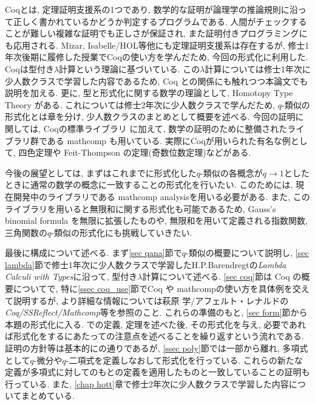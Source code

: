 \documentclass[11pt]{jsreport}
\theoremstyle{mystyle}
\newcommand{\0}{\textbf{0}}
\newcommand{\1}{\textbf{1}}
\newcommand{\2}{\textbf{2}}
\begin{document}
Coqとは, 定理証明支援系の1つであり, 数学的な証明が論理学の推論規則に沿って正しく書かれているかどうか判定するプログラムである.
人間がチェックすることが難しい複雑な証明でも正しさが保証され, また証明付きプログラミングにも応用される. Mizar, Isabelle/HOL等他にも定理証明支援系は存在するが, 修士1年次後期に履修した授業でCoqの使い方を学んだため, 今回の形式化に利用した. 
Coqは型付き$\lambda$計算という理論に基づいている. この$\lambda$計算については修士1年次に少人数クラスで学習した内容であるため, Coq との関係にも触れつつ本論文でも説明を加える. 更に, 型と形式化に関する数学の理論として, Homotopy Type Theory がある. これについては修士2年次に少人数クラスで学んだため, $q$-類似の形式化とは章を分け, 少人数クラスのまとめとして概要を述べる. 今回の証明に関しては, Coqの標準ライブラリ \cite{coq sl}に加えて, 数学の証明のために整備されたライブラリ群である mathcomp \cite{coq mc}も用いている. 
実際にCoqが用いられた有名な例として, 四色定理や Feit-Thompson の定理(奇数位数定理)などがある. 

今後の展望としては, まずはこれまでに形式化した$q$-類似の各概念が$q \to 1$としたときに通常の数学の概念に一致することの形式化を行いたい. このためには, 現在開発中のライブラリである mathcomp analysis\cite{coq ana}を用いる必要がある. また, このライブラリを用いると無限和に関する形式化も可能であるため, Gauss's binomial formula を無限に拡張したものや, 無限和を用いて定義される指数関数, 三角関数の$q$-類似の形式化にも挑戦していきたい. 

最後に構成について述べる. 
まず\ref{sec qana}節で$q$-類似の概要について説明し, 
\ref{sec lambda}節で修士1年次に少人数クラスで学習したH.P.Barendregtの{\it Lambda Calculi with Types}\cite{Bar}に沿って, 型付き$\lambda$計算について述べる. 
\ref{sec coq}節は Coq の概要についてで, 特に\ref{ssec coq_use}節でCoq や mathcompの使い方を具体例を交えて説明するが, より詳細な情報については萩原 学/アフェルト・レナルドの{\it Coq/SSReflect/Mathcomp}\cite{Hag}等を参照のこと. 
これらの準備のもと, \ref{sec form}節から本題の形式化に入る. \cite{Kac}での定義, 定理を述べた後, その形式化を与え, 必要であれば形式化をするにあたっての注意点を述べることを繰り返すという流れである. 
証明の方針等は基本的に\cite{Kac}の通りであるが, \ref{ssec poly}節では一部\cite{Kac}から離れ, 多項式として$q$-微分や$q$-二項式を定義しなおして形式化を行っている. これらの新たな定義が多項式に対してのもとの定義を適用したものと一致していることの証明も行っている. また, \ref{chap hott}章で修士2年次に少人数クラスで学習した内容についてまとめている. 
\end{document}
